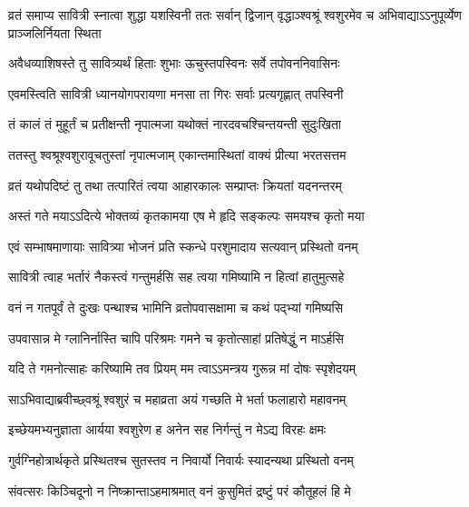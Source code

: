 \begin{center}
\threelineshloka
{व्रतं समाप्य सावित्री स्नात्वा शुद्धा यशस्विनी}
{ततः सर्वान् द्विजान् वृद्धाञ्श्वश्रूं श्वशुरमेव च}
{अभिवाद्याऽऽनुपूर्व्येण प्राञ्जलिर्नियता स्थिता}

\twolineshloka
{अवैधव्याशिषस्ते तु सावित्र्यर्थं हिताः शुभाः}
{ऊचुस्तपस्विनः सर्वे तपोवननिवासिनः}

\twolineshloka
{एवमस्त्विति सावित्री ध्यानयोगपरायणा}
{मनसा ता गिरः सर्वाः प्रत्यगृह्णात् तपस्विनी}

\twolineshloka
{तं कालं तं मुहूर्तं च प्रतीक्षन्ती नृपात्मजा}
{यथोक्तं नारदवचश्चिन्तयन्ती सुदुःखिता}

\twolineshloka
{ततस्तु श्वश्रूश्वशुरावूचतुस्तां नृपात्मजाम्}
{एकान्तमास्थितां वाक्यं प्रीत्या भरतसत्तम}

\twolineshloka
{व्रतं यथोपदिष्टं तु तथा तत्पारितं त्वया}
{आहारकालः सम्प्राप्तः क्रियतां यदनन्तरम्}


\twolineshloka
{अस्तं गते मयाऽऽदित्ये भोक्तव्यं कृतकामया}
{एष मे हृदि सङ्कल्पः समयश्च कृतो मया}


\twolineshloka
{एवं सम्भाषमाणायाः सावित्र्या भोजनं प्रति}
{स्कन्धे परशुमादाय सत्यवान् प्रस्थितो वनम्}

\twolineshloka
{सावित्री त्वाह भर्तारं नैकस्त्वं गन्तुमर्हसि}
{सह त्वया गमिष्यामि न हित्वां हातुमुत्सहे}


\twolineshloka
{वनं न गतपूर्वं ते दुःखः पन्थाश्च भामिनि}
{व्रतोपवासक्षामा च कथं पद्भ्यां गमिष्यसि}


\twolineshloka
{उपवासान्न मे ग्लानिर्नास्ति चापि परिश्रमः}
{गमने च कृतोत्साहां प्रतिषेद्धुं न माऽर्हसि}


\twolineshloka
{यदि ते गमनोत्साहः करिष्यामि तव प्रियम्}
{मम त्वाऽऽमन्त्रय गुरून्न मां दोषः स्पृशेदयम्}


\twolineshloka
{साऽभिवाद्याब्रवीच्छ्वश्रूं श्वशुरं च महाव्रता}
{अयं गच्छति मे भर्ता फलाहारो महावनम्}

\twolineshloka
{इच्छेयमभ्यनुज्ञाता आर्यया श्वशुरेण ह}
{अनेन सह निर्गन्तुं न मेऽद्य विरहः क्षमः}

\twolineshloka
{गुर्वग्निहोत्रार्थकृते प्रस्थितश्च सुतस्तव}
{न निवार्यो निवार्यः स्यादन्यथा प्रस्थितो वनम्}

\twolineshloka
{संवत्सरः किञ्चिदूनो न निष्क्रान्ताऽहमाश्रमात्}
{वनं कुसुमितं द्रष्टुं परं कौतूहलं हि मे}


\end{center}
